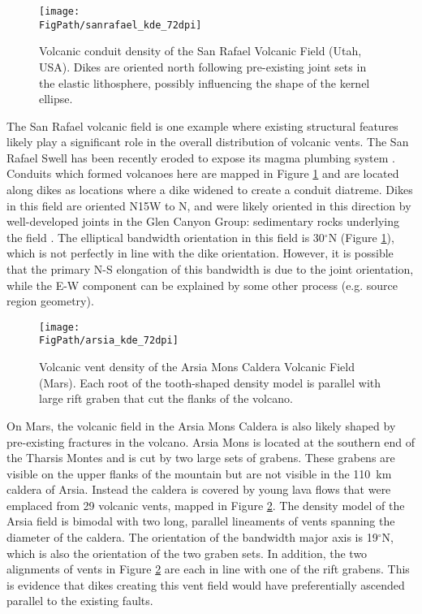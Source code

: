 \begin{figure}
\centering
\texttt{[image: \\FigPath/sanrafael\_kde\_72dpi]}
\caption[Volcanic conduit density of the San Rafael Volcanic Field (Utah, USA)]{Volcanic conduit density of the San Rafael Volcanic Field (Utah, USA). Dikes are oriented north following pre-existing joint sets in the elastic lithosphere, possibly influencing the shape of the kernel ellipse.}
\label{fig_sanrafaelkde}
\end{figure}

The San Rafael volcanic field is one example where existing structural features likely play a significant role in the overall distribution of volcanic vents. The San Rafael Swell has been recently eroded to expose its magma plumbing system \citep{richardson2015sills}. Conduits which formed volcanoes here are mapped in Figure \ref{fig_sanrafaelkde} and are located along dikes as locations where a dike widened to create a conduit diatreme. Dikes in this field are oriented N15W to N, and were likely oriented in this direction by well-developed joints in the Glen Canyon Group: sedimentary rocks underlying the field \citep{delaney1997physical}. The elliptical bandwidth orientation in this field is 30$^{\circ}$N (Figure \ref{fig_sanrafaelkde}), which is not perfectly in line with the dike orientation. However, it is possible that the primary N-S elongation of this bandwidth is due to the joint orientation, while the E-W component can be explained by some other process (e.g. source region geometry).


\begin{figure}
\centering
\texttt{[image: \\FigPath/arsia\_kde\_72dpi]}
\caption[Volcanic vent density of the Arsia Mons Caldera Volcanic Field (Mars)]{Volcanic vent density of the Arsia Mons Caldera Volcanic Field (Mars). Each root of the tooth-shaped density model is parallel with large rift graben that cut the flanks of the volcano.}
\label{fig_arsiakde}
\end{figure}

On Mars, the volcanic field in the Arsia Mons Caldera is also likely shaped by pre-existing fractures in the volcano. Arsia Mons is located at the southern end of the Tharsis Montes and is cut by two large sets of grabens. These grabens are visible on the upper flanks of the mountain but are not visible in the 110~km caldera of Arsia. Instead the caldera is covered by young lava flows that were emplaced from 29 volcanic vents, mapped in Figure \ref{fig_arsiakde}. The density model of the Arsia field is bimodal with two long, parallel lineaments of vents spanning the diameter of the caldera. The orientation of the bandwidth major axis is 19$^{\circ}$N, which is also the orientation of the two graben sets. In addition, the two alignments of vents in Figure \ref{fig_arsiakde} are each in line with one of the rift grabens. This is evidence that dikes creating this vent field would have preferentially ascended parallel to the existing faults.

